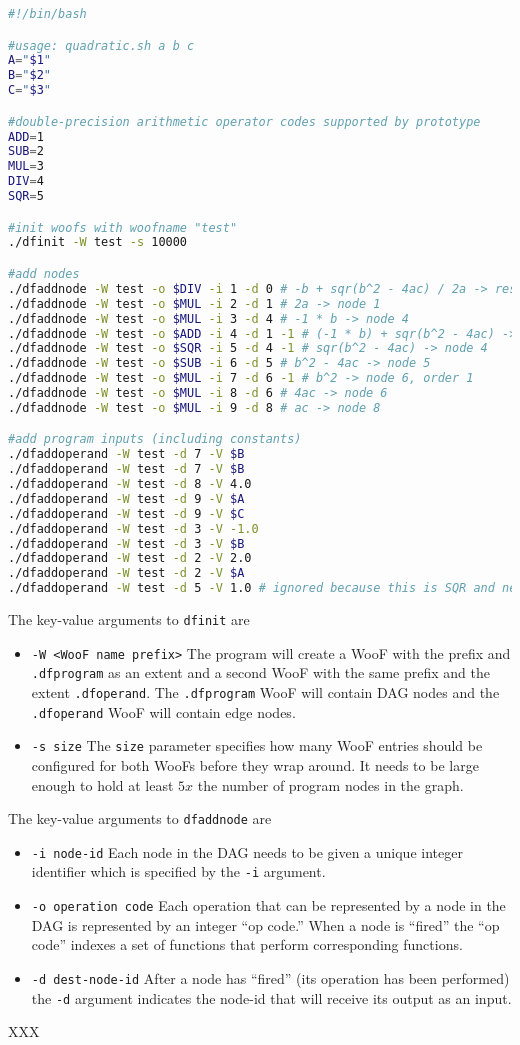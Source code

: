 \documentclass[10pt]{article}
\begin{document}
\begin{lstlisting}[language=bash,caption={quadratic.sh}]
#!/bin/bash

#usage: quadratic.sh a b c
A="$1"
B="$2"
C="$3"

#double-precision arithmetic operator codes supported by prototype
ADD=1
SUB=2
MUL=3
DIV=4
SQR=5

#init woofs with woofname "test"
./dfinit -W test -s 10000

#add nodes
./dfaddnode -W test -o $DIV -i 1 -d 0 # -b + sqr(b^2 - 4ac) / 2a -> result
./dfaddnode -W test -o $MUL -i 2 -d 1 # 2a -> node 1
./dfaddnode -W test -o $MUL -i 3 -d 4 # -1 * b -> node 4
./dfaddnode -W test -o $ADD -i 4 -d 1 -1 # (-1 * b) + sqr(b^2 - 4ac) -> node 1, order 1
./dfaddnode -W test -o $SQR -i 5 -d 4 -1 # sqr(b^2 - 4ac) -> node 4
./dfaddnode -W test -o $SUB -i 6 -d 5 # b^2 - 4ac -> node 5
./dfaddnode -W test -o $MUL -i 7 -d 6 -1 # b^2 -> node 6, order 1
./dfaddnode -W test -o $MUL -i 8 -d 6 # 4ac -> node 6
./dfaddnode -W test -o $MUL -i 9 -d 8 # ac -> node 8

#add program inputs (including constants)
./dfaddoperand -W test -d 7 -V $B
./dfaddoperand -W test -d 7 -V $B
./dfaddoperand -W test -d 8 -V 4.0
./dfaddoperand -W test -d 9 -V $A
./dfaddoperand -W test -d 9 -V $C
./dfaddoperand -W test -d 3 -V -1.0
./dfaddoperand -W test -d 3 -V $B
./dfaddoperand -W test -d 2 -V 2.0
./dfaddoperand -W test -d 2 -V $A
./dfaddoperand -W test -d 5 -V 1.0 # ignored because this is SQR and need two op

\end{lstlisting}
The key-value arguments to \verb+dfinit+ are
\begin{itemize}
\item \verb+-W <WooF name prefix>+ The program will create a WooF with the
prefix and \verb+.dfprogram+ as an extent and a second WooF with the same
prefix and the extent \verb+.dfoperand+.  The \verb+.dfprogram+ WooF will
contain DAG nodes and the \verb+.dfoperand+ WooF will contain edge nodes.
\item \verb+-s size+ The \verb+size+ parameter specifies how many WooF entries
should be configured for both WooFs before they wrap around.  It needs to be
large enough to hold at least $5x$ the number of program nodes in the graph.
\end{itemize}

The key-value arguments to \verb+dfaddnode+ are
\begin{itemize}
\item \verb+-i node-id+ Each node in the DAG needs to be given a unique
integer identifier which is specified by the \verb+-i+ argument.
\item \verb+-o operation code+ Each operation that can be represented
by a node in the DAG is represented by an integer ``op code.''  When a node is
``fired'' the ``op code'' indexes a set of functions that perform
corresponding functions.    
\item \verb+-d dest-node-id+ After a node has ``fired'' (its operation
has been performed) the \verb+-d+ argument indicates the node-id that will
receive its output as an input.
\end{itemize}
XXX
\end{document}
